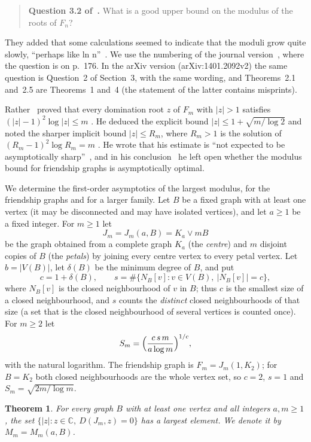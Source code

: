\documentclass[11pt]{article}
\newtheorem{theorem}{Theorem}
\theoremstyle{definition}
\theoremstyle{remark}
\newcommand{\C}{\mathbb C}
\begin{document}
\begin{quote}
\textbf{Question 3.2 of~\cite{abj}.} What is a good upper bound on the
modulus of the roots of $F_n$?
\end{quote}

\noindent They added that some calculations seemed to indicate that the
moduli grow quite slowly, ``perhaps like ln n''~\cite[p.~176]{abj}. We use
the numbering of the journal version~\cite{abj}, where the question is on
p.~176. In the arXiv version (arXiv:1401.2092v2) the same question is
Question~2 of Section~3, with the same wording, and Theorems~2.1 and~2.5 are
Theorems~1 and~4 (the statement of the latter contains misprints).

Rather~\cite[Section~4]{ra} proved that every domination root $z$ of $F_m$
with $|z|>1$ satisfies $(|z|-1)^2\log|z|\le m$ \cite[Theorem~4.1]{ra}. He
deduced the explicit bound $|z|\le 1+\sqrt{m/\log 2}$
\cite[Corollary~4.2]{ra} and noted the sharper implicit bound $|z|\le R_m$,
where $R_m>1$ is the solution of $(R_m-1)^2\log R_m=m$ \cite[Remark~4.3]{ra}.
He wrote that his estimate is ``not expected to be asymptotically
sharp''~\cite[p.~10]{ra}, and in his conclusion~\cite[Section~7]{ra} he left open whether
the
modulus bound for friendship graphs is asymptotically optimal.

We determine the first-order asymptotics of the largest modulus, for the
friendship graphs and for a larger family. Let $B$ be a fixed graph with at
least one vertex (it may be disconnected and may have isolated vertices), and
let $a\ge1$ be a fixed integer. For $m\ge1$ let
\[
J_m=J_m(a,B)=K_a\vee mB
\]
be the graph obtained from a complete graph $K_a$ (the \emph{centre}) and $m$
disjoint copies of $B$ (the \emph{petals}) by joining every centre vertex to
every petal vertex. Let $b=|V(B)|$, let $\delta(B)$ be the minimum degree of
$B$, and put
\[
c=1+\delta(B),\qquad s=\#\{N_B[v]:v\in V(B),\ |N_B[v]|=c\},
\]
where $N_B[v]$ is the closed neighbourhood of $v$ in $B$; thus $c$ is the
smallest size of a closed neighbourhood, and $s$ counts the \emph{distinct}
closed neighbourhoods of that size (a set that is the closed neighbourhood of
several vertices is counted once). For $m\ge2$ let
\[
S_m=\Bigl(\frac{c\,s\,m}{a\log m}\Bigr)^{1/c},
\]
with the natural logarithm. The friendship graph is $F_m=J_m(1,K_2)$; for
$B=K_2$ both closed neighbourhoods are the whole vertex set, so $c=2$, $s=1$
and $S_m=\sqrt{2m/\log m}$.

\begin{theorem}\label{thm:attain}
For every graph $B$ with at least one vertex and all integers $a,m\ge1$, the
set $\{|z|: z\in\C,\ D(J_m,z)=0\}$ has a largest element. We denote it by
$M_m=M_m(a,B)$.
\end{theorem}
\end{document}
